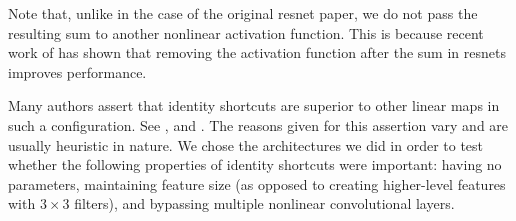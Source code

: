 \documentclass{article} %
\begin{document}
Note that, unlike in the case of the original resnet paper, we do not pass the resulting sum to another nonlinear activation function.  This is because recent work of \cite{EraseRelu} has shown that removing the activation function after the sum in resnets improves performance.  



Many authors assert that identity shortcuts are superior to other linear maps in such a configuration. See \cite{IdentityMappings,InceptionResNet,ResNets, ResidualGates}, and \cite{Demystifying}.  The reasons given for this assertion vary and are usually heuristic in nature. 
We chose the architectures we did in order to test whether the following properties of identity shortcuts were important: having no parameters, maintaining feature size (as opposed to creating higher-level features with $3 \times 3$ filters), and bypassing multiple nonlinear convolutional layers.  
\end{document}

